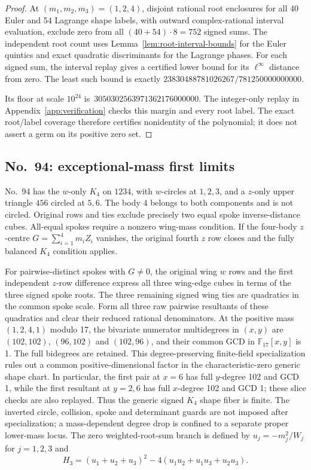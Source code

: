\documentclass[11pt]{amsart}
\theoremstyle{remark}
\newcommand{\Needspace}[1]{\par\ifdim\dimexpr\pagegoal-\pagetotal\relax<#1\newpage\fi}
\begin{document}
\begin{proof}
At $(m_1,m_2,m_3)=(1,2,4)$, disjoint rational root enclosures for all 40 Euler and 54 Lagrange shape labels, with outward complex-rational interval evaluation, exclude zero from all $(40+54)\cdot8=752$ signed sums. The independent root count uses Lemma~\ref{lem:root-interval-bounds} for the Euler quintics and exact quadratic discriminants for the Lagrange phases. For each signed sum, the interval replay gives a certified lower bound for its $\ell^\infty$ distance from zero. The least such bound is exactly $23830488781026267/781250000000000$. \Needspace{2\baselineskip}Its floor at scale $10^{24}$ is~$3050302563971362176000000$. The integer-only replay in Appendix~\ref{app:verification} checks this margin and every root label. The exact root/label coverage therefore certifies nonidentity of the polynomial; it does not assert a germ on its positive zero set.
\end{proof}

\subsection{No.~94: exceptional-mass first limits}\label{sec:no94}
No.~94 has the $w$-only $K_4$ on $1234$, with $w$-circles at $1,2,3$, and a $z$-only upper triangle $456$ circled at $5,6$. The body 4 belongs to both components and is not circled. Original rows and ties exclude precisely two equal spoke inverse-distance cubes. All-equal spokes require a nonzero wing-mass condition. If the four-body $z$-centre $G=\sum_{i=1}^4m_iZ_i$ vanishes, the original fourth $z$ row closes and the fully balanced $K_4$ condition applies.

For pairwise-distinct spokes with $G\ne0$, the original wing $w$ rows and the first independent $z$-row difference express all three wing-edge cubes in terms of the three signed spoke roots. The three remaining signed wing ties are quadratics in the common spoke scale. Form all three raw pairwise resultants of these quadratics and clear their reduced rational denominators. At the positive mass $(1,2,4,1)$ modulo 17, the bivariate numerator multidegrees in $(x,y)$ are $(102,102)$, $(96,102)$ and $(102,96)$, and their common GCD in $\mathbb F_{17}[x,y]$ is 1. The full bidegrees are retained. This degree-preserving finite-field specialization rules out a common positive-dimensional factor in the characteristic-zero generic shape chart. In particular, the first pair at $x=6$ has full $y$-degree 102 and GCD 1, while the first resultant at $y=2,6$ has full $x$-degree 102 and GCD 1; these slice checks are also replayed. Thus the generic signed $K_4$ shape fiber is finite. The inverted circle, collision, spoke and determinant guards are not imposed after specialization; a mass-dependent degree drop is confined to a separate proper lower-mass locus. The zero weighted-root-sum branch is defined by $u_j=-m_j^2/W_j$ for $j=1,2,3$ and
\begin{equation}\label{eq:no94-root-norm}
H_3=(u_1+u_2+u_3)^2-4(u_1u_2+u_1u_3+u_2u_3).
\end{equation}
\end{document}
